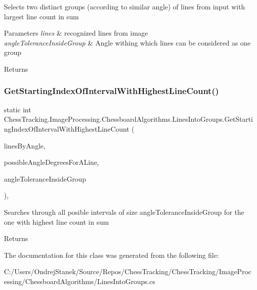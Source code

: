 Selects two distinct groups (according to similar angle) of lines from input with largest line count in sum 


\begin{DoxyParams}{Parameters}
{\em lines} & recognized lines from image\\
\hline
{\em angle\+Tolerance\+Inside\+Group} & Angle withing which lines can be considered as one group\\
\hline
\end{DoxyParams}
\begin{DoxyReturn}{Returns}

\end{DoxyReturn}
\mbox{\label{class_chess_tracking_1_1_image_processing_1_1_chessboard_algorithms_1_1_lines_into_groups_a32efa1b87e4bac9c7f78f5a1f2a005fd}} 
\subsubsection{\texorpdfstring{GetStartingIndexOfIntervalWithHighestLineCount()}{GetStartingIndexOfIntervalWithHighestLineCount()}}
{\footnotesize\ttfamily static int Chess\+Tracking.\+Image\+Processing.\+Chessboard\+Algorithms.\+Lines\+Into\+Groups.\+Get\+Starting\+Index\+Of\+Interval\+With\+Highest\+Line\+Count (\begin{DoxyParamCaption}\item[{List$<$ Line\+Segment2D $>$ \mbox{[}$\,$\mbox{]}}]{lines\+By\+Angle,  }\item[{int}]{possible\+Angle\+Degrees\+For\+A\+Line,  }\item[{int}]{angle\+Tolerance\+Inside\+Group }\end{DoxyParamCaption})\hspace{0.3cm}{\ttfamily [static]}, {\ttfamily [private]}}



Searches through all posible intervals of size angle\+Tolerance\+Inside\+Group for the one with highest line count in sum 

\begin{DoxyReturn}{Returns}

\end{DoxyReturn}


The documentation for this class was generated from the following file\+:\begin{DoxyCompactItemize}
\item 
C\+:/\+Users/\+Ondrej\+Stanek/\+Source/\+Repos/\+Chess\+Tracking/\+Chess\+Tracking/\+Image\+Processing/\+Chessboard\+Algorithms/Lines\+Into\+Groups.\+cs\end{DoxyCompactItemize}
